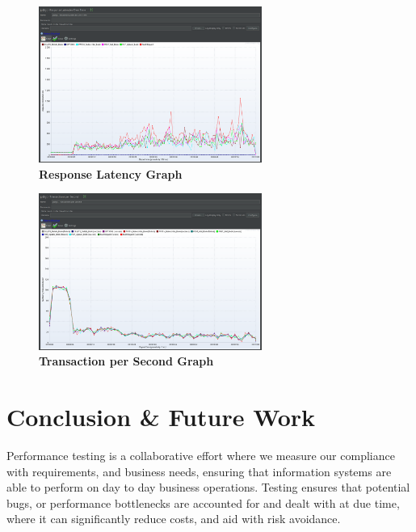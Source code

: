 \documentclass[a4paper, 12pt]{article}
\begin{document}
\begin{figure}[H]
    \centering
    \includegraphics[width=0.65\textwidth]{../perfRuns2/thirdRunRespLatency.png}
    \caption{\textbf{Response Latency Graph}}
\end{figure}

\begin{figure}[H]
    \centering
    \includegraphics[width=0.65\textwidth]{../perfRuns2/thirdRunTrans.png}
    \caption{\textbf{Transaction per Second Graph}}
\end{figure}

\newpage

\section{Conclusion \& Future Work}

\par Performance testing is a collaborative effort where we measure our compliance with requirements, and business needs, ensuring
that information systems are able to perform on day to day business operations. Testing ensures that potential bugs, or performance bottlenecks
are accounted for and dealt with at due time, where it can significantly reduce costs, and aid with risk avoidance.

\newpage

\printbibliography[heading=bibintoc]
\end{document}
